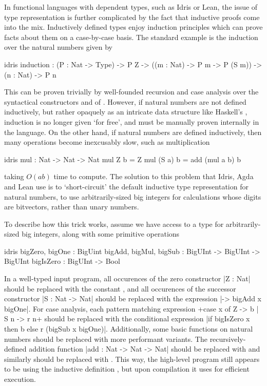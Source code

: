 In functional languages with dependent types, such as Idris or Lean, the issue
of type representation is further complicated by the fact that inductive proofs
come into the mix. Inductively defined types enjoy induction principles which
can prove facts about them on a case-by-case basis. The standard example is the
induction over the natural numbers  given by
\begin{bminted}{idris}
  induction : (P : Nat -> Type) -> P Z -> ((m : Nat) -> P m -> P (S m)) -> (n : Nat) -> P n
\end{bminted}
This can be proven trivially by well-founded recursion and case analysis over
the syntactical constructors  and  of . However, if
natural numbers are not defined inductively, but rather opaquely as an
intricate data structure like Haskell's , induction is no longer
given `for free', and must be manually proven internally in the language. On
the other hand, if natural numbers are defined inductively, then many
operations become inexcusably slow, such as multiplication
\begin{bminted}{idris}
  mul : Nat -> Nat -> Nat
  mul Z b = Z
  mul (S a) b = add (mul a b) b
\end{bminted}
taking $O(a b)$ time to compute. The solution to this problem that Idris, Agda
and Lean use is to `short-circuit' the default inductive type representation for
natural numbers, to use arbitrarily-sized big integers for calculations whose
digits are bitvectors, rather than unary numbers.

To describe how this trick works, assume we have access to a type 
for arbitrarily-sized big integers, along with some primitive operations
\begin{bminted}{idris}
  bigZero, bigOne : BigUint
  bigAdd, bigMul, bigSub : BigUInt -> BigUInt -> BigUInt
  bigIsZero : BigUInt -> Bool
\end{bminted}
In a well-typed input program, all occurences of the zero constructor \idr|Z : Nat|
should be replaced with the constant , and all occurences of the
successor constructor \idr|S : Nat -> Nat| should be replaced with the expression
\idr|\x -> bigAdd x bigOne|. For case analysis, each pattern matching expression
\idr+case x of Z -> b | S n -> r n+ should be replaced with the conditional
expression \idr|if bigIsZero x then b else r (bigSub x bigOne)|. Additionally,
some basic functions on natural numbers should be replaced with more performant
variants. The recursively-defined addition function \idr|add : Nat -> Nat -> Nat|
should be replaced with  and similarly  should be replaced with
.
This way, the high-level program still appears to be using the inductive definition
, but upon compilation it uses  for efficient execution.

